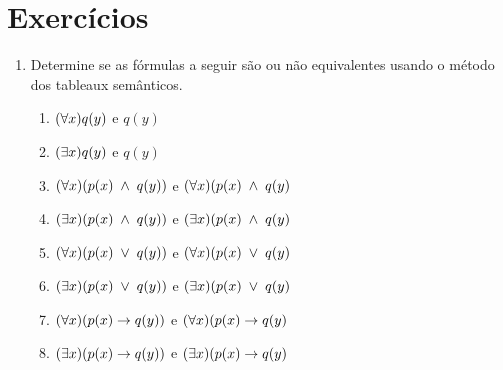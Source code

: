 \section{Exercícios}


\begin{enumerate}
  \item Determine se as fórmulas a seguir são ou não equivalentes usando o método dos tableaux semânticos.
    \begin{enumerate}
      \item $(\forall x)q(y)$ e $q(y)$
      \item $(\exists x)q(y)$ e $q(y)$
      \item $(\forall x)(p(x) \;\land\; q(y))$ e $(\forall x)(p(x) \;\land\; q(y)$
      \item $(\exists x)(p(x) \;\land\; q(y))$ e $(\exists x)(p(x) \;\land\; q(y)$
      \item $(\forall x)(p(x) \;\lor\; q(y))$ e $(\forall x)(p(x) \;\lor\; q(y)$
      \item $(\exists x)(p(x) \;\lor\; q(y))$ e $(\exists x)(p(x) \;\lor\; q(y)$
      \item $(\forall x)(p(x) \rightarrow q(y))$ e $(\forall x)(p(x) \rightarrow q(y)$
      \item $(\exists x)(p(x) \rightarrow q(y))$ e $(\exists x)(p(x) \rightarrow q(y)$
    \end{enumerate}
\end{enumerate}
